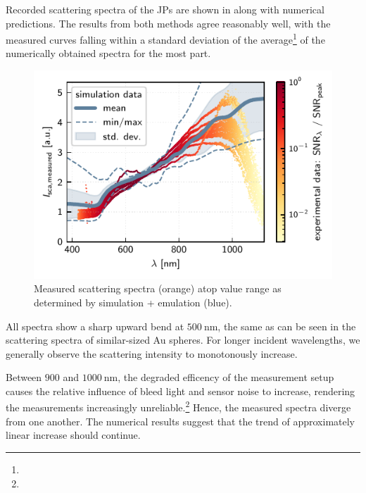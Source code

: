 \documentclass[10pt]{article}
\newcommand{\reffig}[2]{\mbox{\sffamily{Figure \ref{#1}#2}}}
\begin{document}
Recorded scattering spectra of the JPs are shown in \reffig{fig:spectra-measured}, along with numerical predictions. 
The results from both methods agree reasonably well, with the measured curves falling within a standard deviation of the average\footnote{} of the numerically obtained spectra for the most part. 

\begin{figure}[h]
    \centering
    \includegraphics{[fig] spectra (measured).PDF}
    \caption{Measured scattering spectra (orange) atop value range as determined by simulation + emulation (blue).}
    \label{fig:spectra-measured}
\end{figure}


All spectra show a sharp upward bend at $\SI{500}{\nano\meter}$, the same as can be seen in the scattering spectra of similar-sized Au spheres. 
For longer incident wavelengths, we generally observe the scattering intensity to monotonously increase. 

Between $900$ and $\SI{1000}{\nano\meter}$, the degraded efficency of the measurement setup causes the relative influence of bleed light and sensor noise to increase, rendering the measurements increasingly unreliable.\footnote{} 
Hence, the measured spectra diverge from one another. 
The numerical results suggest that the trend of approximately linear increase should continue. 
\end{document}
